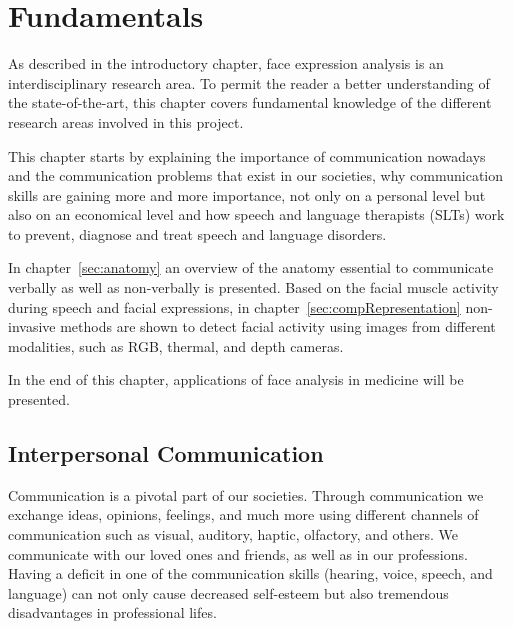 \chapter{Fundamentals}
\label{cha:fundamentals}

As described in the introductory chapter, face expression analysis is an interdisciplinary research area. To permit the reader a better understanding of the state-of-the-art, this chapter covers fundamental knowledge of the different research areas involved in this project. 

This chapter starts by explaining the importance of communication nowadays and the communication problems that exist in our societies, why communication skills are gaining more and more importance, not only on a personal level but also on an economical level and how speech and language therapists (SLTs) work to prevent, diagnose and treat speech and language disorders.

In chapter~\ref{sec:anatomy} an overview of the anatomy essential to communicate verbally as well as non-verbally is presented. Based on the facial muscle activity during speech and facial expressions, in chapter~\ref{sec:compRepresentation} non-invasive methods are shown to detect facial activity using images from different modalities, such as RGB, thermal, and depth cameras.

In the end of this chapter, applications of face analysis in medicine will be presented. 


\section{Interpersonal Communication} %
\label{sec:communication}

Communication is a pivotal part of our societies. Through communication we exchange ideas, opinions, feelings, and much more using different channels of communication such as visual, auditory, haptic, olfactory, and others. We communicate with our loved ones and friends, as well as in our professions. Having a deficit in one of the communication skills (hearing, voice, speech, and language) can not only cause decreased self-esteem but also tremendous disadvantages in professional lifes. 

